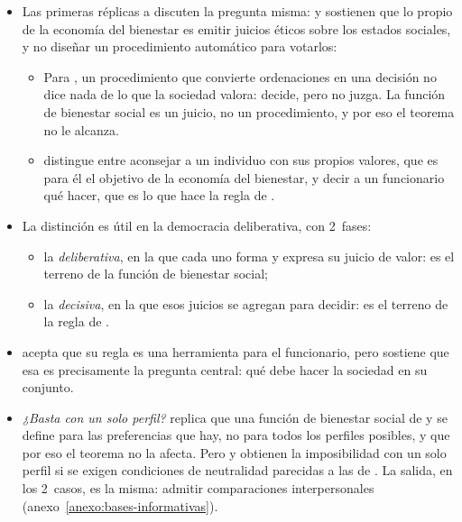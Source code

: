 \documentclass[11pt]{article}
\begin{document}
\begin{itemize}
\item Las primeras réplicas a  discuten la pregunta misma: \textcite{Little1952Social} y \textcite{Bergson1954Concept} sostienen que lo propio de la economía del bienestar es emitir juicios éticos sobre los estados sociales, y no diseñar un procedimiento automático para votarlos:
  \begin{itemize}
  \item Para , un procedimiento que convierte ordenaciones en una decisión no dice nada de lo que la sociedad valora: decide, pero no juzga. La función de bienestar social es un juicio, no un procedimiento, y por eso el teorema no le alcanza.
  \item {} distingue entre aconsejar a un individuo con sus propios valores, que es para él el objetivo de la economía del bienestar, y decir a un funcionario qué hacer, que es lo que hace la regla de .
  \end{itemize}
\item La distinción es útil en la democracia deliberativa, con 2~fases:
  \begin{itemize}
  \item la \emph{deliberativa}, en la que cada uno forma y expresa su juicio de valor: es el terreno de la función de bienestar social;
  \item la \emph{decisiva}, en la que esos juicios se agregan para decidir: es el terreno de la regla de .
  \end{itemize}
\item {} acepta que su regla es una herramienta para el funcionario, pero sostiene que esa es precisamente la pregunta central: qué debe hacer la sociedad en su conjunto.
\item \emph{¿Basta con un solo perfil?} \textcite{Samuelson1977Reaffirming} replica que una función de bienestar social de  y  se define para las preferencias que hay, no para todos los perfiles posibles, y que por eso el teorema no la afecta. Pero \textcite{KempNg1976Existence} y \textcite{Parks1976Impossibility} obtienen la imposibilidad con un solo perfil si se exigen condiciones de neutralidad parecidas a las de . La salida, en los 2~casos, es la misma: admitir comparaciones interpersonales (anexo~\ref{anexo:bases-informativas}).
\end{itemize}
\end{document}
